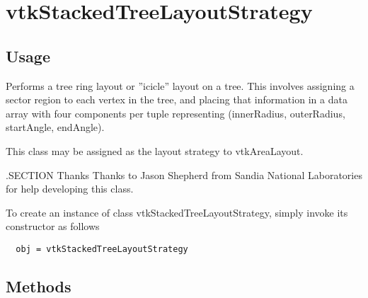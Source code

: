 \section{vtkStackedTreeLayoutStrategy}

\subsection{Usage}

 Performs a tree ring layout or ''icicle'' layout on a tree.
 This involves assigning a sector region to each vertex in the tree,
 and placing that information in a data array with four components per
 tuple representing (innerRadius, outerRadius, startAngle, endAngle).

 This class may be assigned as the layout strategy to vtkAreaLayout.

 .SECTION Thanks
 Thanks to Jason Shepherd from Sandia National Laboratories
 for help developing this class.

To create an instance of class vtkStackedTreeLayoutStrategy, simply
invoke its constructor as follows
\begin{verbatim}
  obj = vtkStackedTreeLayoutStrategy
\end{verbatim}
\subsection{Methods}

